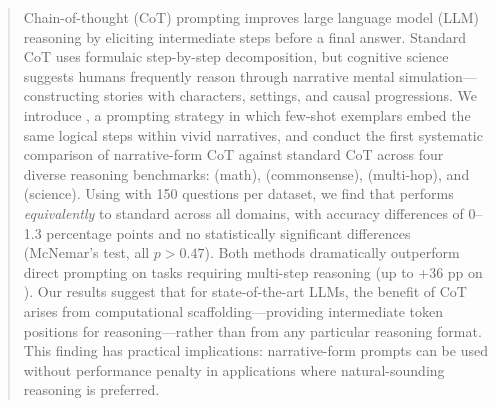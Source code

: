 \begin{abstract}
Chain-of-thought (CoT) prompting improves large language model (LLM) reasoning by eliciting intermediate steps before a final answer. Standard CoT uses formulaic step-by-step decomposition, but cognitive science suggests humans frequently reason through narrative mental simulation---constructing stories with characters, settings, and causal progressions. We introduce \storycot, a prompting strategy in which few-shot exemplars embed the same logical steps within vivid narratives, and conduct the first systematic comparison of narrative-form CoT against standard CoT across four diverse reasoning benchmarks: \gsm (math), \csqa (commonsense), \strategyqa (multi-hop), and \arc (science). Using \gptfour with 150 questions per dataset, we find that \storycot performs \emph{equivalently} to standard \fewshotcot across all domains, with accuracy differences of 0--1.3 percentage points and no statistically significant differences (McNemar's test, all $p > 0.47$). Both methods dramatically outperform direct prompting on tasks requiring multi-step reasoning (up to +36 pp on \gsm). Our results suggest that for state-of-the-art LLMs, the benefit of CoT arises from computational scaffolding---providing intermediate token positions for reasoning---rather than from any particular reasoning format. This finding has practical implications: narrative-form prompts can be used without performance penalty in applications where natural-sounding reasoning is preferred.
\end{abstract}

